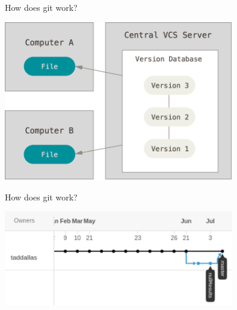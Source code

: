 \documentclass[12pt]{beamer}
\begin{document}
\begin{frame}

	\begin{flushright}
		\Large \textcolor{boss2}{How does git work?} 
	\end{flushright}

  \includegraphics[width=0.75\textwidth]{figs/centralized.png}
\end{frame}











\begin{frame}

	\begin{flushright}
	\Large \textcolor{boss2}{How does git work?} 
	\end{flushright}

  \includegraphics[width=0.75\textwidth]{figs/gitHistory.png}


\end{frame}
\end{document}
